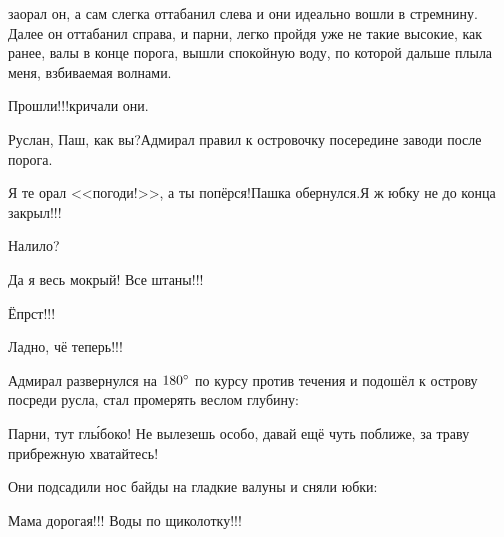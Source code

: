 \mdash заорал он, а сам слегка оттабанил слева и они идеально вошли в стремнину. Далее он оттабанил справа, и парни, легко пройдя уже не такие высокие, как ранее, валы в конце порога, вышли спокойную воду, по которой дальше плыла меня, взбиваемая волнами.

\diagdash Прошли!!!\mdash кричали они.

\diagdash Руслан, Паш, как вы?\mdash Адмирал правил к островочку посередине заводи после порога.

\diagdash Я те орал <<погоди!>>, а ты попёрся!\mdash Пашка обернулся.\mdash Я ж юбку не до конца закрыл!!!

\diagdash Налило?

\diagdash Да я весь мокрый! Все штаны!!!

\diagdash Ёпрст!!!

\diagdash Ладно, чё теперь!!!

Адмирал развернулся на $180\degree$ по курсу против течения и подошёл к острову посреди русла, стал промерять веслом глубину:

\diagdash Парни, тут гл{\'ы}боко! Не вылезешь особо, давай ещё чуть поближе, за траву прибрежную хватайтесь!

Они подсадили нос байды на гладкие валуны и сняли юбки:

\diagdash Мама дорогая!!! Воды по щиколотку!!! 
 



\begin{center}
\end{center}

